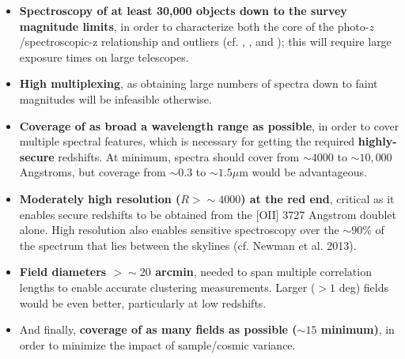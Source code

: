 \begin{itemize}
\item {\bf Spectroscopy of at least 30,000 objects down to the survey magnitude limits}, in order to characterize both the core of the photo-$z$/spectroscopic-z relationship and outliers (cf. \citealt{MaHuterer}, \citealt{BernsteinHuterer}, and \citealt{Hearin10}); this will require large exposure times on large telescopes.
\item {\bf High multiplexing}, as obtaining large numbers of spectra down to faint magnitudes will be infeasible otherwise.
\item {\bf Coverage of as broad a wavelength range as possible}, in order to cover multiple spectral features, which is necessary for getting the required {\bf highly-secure} redshifts.  At minimum, spectra should cover from $\sim 4000$ to $\sim 10,000$ Angstroms, but coverage from $\sim 0.3$ to $\sim 1.5\mu$m would be advantageous.
\item {\bf Moderately high resolution ($R>\sim 4000$) at the red end}, critical as it enables secure redshifts to be obtained from the [OII] 3727 Angstrom doublet alone.  High resolution also enables sensitive spectroscopy over the $\sim 90\%$ of the spectrum that lies between the skylines (cf. Newman et al. 2013).
\item {\bf Field diameters $>\sim20$ arcmin}, needed to span multiple correlation lengths to enable accurate clustering measurements.
Larger ($>1$ deg) fields would be even better, particularly at low redshifts.
\item And finally, {\bf coverage of as many fields as possible ($\sim 15$ minimum)}, in order to minimize the impact of sample/cosmic variance.
\end{itemize}


